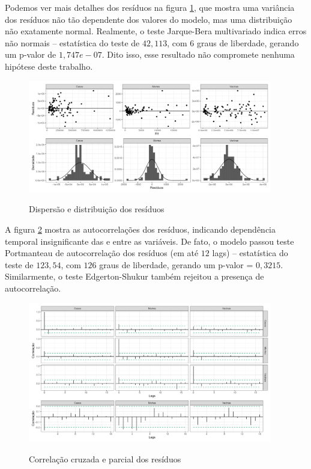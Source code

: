 \documentclass[
    article,
	12pt,				%
	oneside,			%
	a4paper,			%
	english,			%
	brazil,				%
	hyperref = {colorlinks, citecolor=c1d, linkcolor=c2d, urlcolor=c3d, colorlinks}
	]{abntex2}
\newcounter{j}
\begin{document}
\begin{apendicesenv}
Podemos ver mais detalhes dos resíduos na figura \ref{fig:varresdist}, que mostra uma variância dos resíduos não tão dependente dos valores do modelo, mas uma distribuição não exatamente normal. Realmente, o teste Jarque-Bera multivariado indica erros não normais -- estatística do teste de $42,113$, com $6$ graus de liberdade, gerando um p-valor de $1,747e-07$. Dito isso, esse resultado não compromete nenhuma hipótese deste trabalho.

\begin{figure}[H]
    \centering
    \caption{Dispersão e distribuição dos resíduos}
    \includegraphics[width = 0.95\textwidth]{Figures/diag_disp-dist.png}
    \label{fig:varresdist}
\end{figure}

A figura \ref{fig:varresacf} mostra as autocorrelações dos resíduos, indicando dependência temporal insignificante das e entre as variáveis. De fato, o modelo passou teste Portmanteau de autocorrelação dos resíduos (em até $12$ lags) -- estatística do teste de $123,54$, com $126$ graus de liberdade, gerando um p-valor = $0,3215$. Similarmente, o teste Edgerton-Shukur também rejeitou a presença de autocorrelação.

\begin{figure}[H]
    \centering
    \caption{Correlação cruzada e parcial dos resíduos}
    \includegraphics[width = 0.95\textwidth]{Figures/diag_acf.png}
    \label{fig:varresacf}
\end{figure}


\end{apendicesenv}
\end{document}
